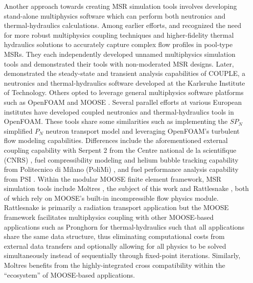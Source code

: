 Another approach towards creating \gls{MSR} simulation tools involves
developing stand-alone multiphysics software which can perform both
neutronics and thermal-hydraulics calculations. Among earlier efforts,
\cite{nicolino_coupled_2008} and \cite{zhang_development_2009} recognized the
need for more robust multiphysics coupling techniques and higher-fidelity
thermal hydraulics solutions to accurately capture complex flow profiles in
pool-type \glspl{MSR}. They each independently developed unnamed multiphysics
simulation tools and demonstrated their tools with non-moderated \gls{MSR}
designs. Later, \cite{li_transient_2015} demonstrated the steady-state and
transient analysis capabilities of COUPLE, a neutronics and thermal-hydraulics
software developed at the Karlsruhe Institute of Technology.  Others opted to
leverage general multiphysics software platforms such as OpenFOAM
\citep{openfoam_openfoam_2021} and \gls{MOOSE}
\citep{gaston_physics-based_2015}.
Several parallel efforts at various European institutes have developed coupled
neutronics and thermal-hydraulics tools in OpenFOAM. These tools share some
similarities such as implementing the $SP_N$ simplified $P_N$ neutron transport
model and leveraging OpenFOAM's turbulent flow modeling capabilities.
Differences include the aforementioned external coupling capability with
Serpent 2 from the Centre national de la scientifique (CNRS)
\citep{blanco_neutronic_2020}, fuel compressibility modeling and helium bubble
tracking capability from Politecnico di Milano (PoliMi)
\citep{cervi_development_2019}, and fuel performance analysis capability from
PSI \citep{fiorina_creation_2018}. Within the modular MOOSE finite element
framework, \gls{MSR} simulation tools include Moltres
\citep{lindsay_introduction_2018}, the subject of this work and Rattlesnake
\citep{wang_rattlesnake_2021}, both of which rely on MOOSE's built-in
incompressible flow physics module. Rattlesnake is primarily a radiation
transport application but the MOOSE framework facilitates multiphysics coupling
with other MOOSE-based applications such as Pronghorn for thermal-hydraulics
such that all applications share the same data structure, thus eliminating
computational costs from external data transfers and optionally allowing for
all physics to be solved simultaneously instead of sequentially through
fixed-point iterations. Similarly, Moltres benefits from the highly-integrated
cross compatibility within the ``ecosystem'' of MOOSE-based applications.

